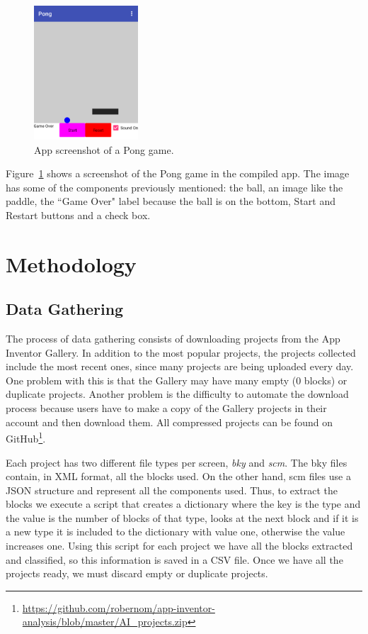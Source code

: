 \documentclass[a4paper]{article}
\begin{document}
\begin{figure}
\begin{center}
\includegraphics[height=5cm]{app-screen}
\caption{App screenshot of a Pong game.}
\label{fig:app-example}
\end{center}
\end{figure}

Figure~\ref{fig:app-example} shows a screenshot of the Pong game in the compiled app. The image has some of the components previously mentioned: the ball, an image like the paddle, the ``Game Over" label because the ball is on the bottom, Start and Restart buttons and a check box.

\section{Methodology}
\subsection{Data Gathering}
The process of data gathering consists of downloading projects from the App Inventor Gallery. In addition to the most popular projects, the projects collected include the most recent ones, since many projects are being uploaded every day. One problem with this is that the Gallery may have many empty (0 blocks) or duplicate projects. Another problem is the difficulty to automate the download process because users have to make a copy of the Gallery projects in their account and then download them. All compressed projects can be found on GitHub\footnote{\url{https://github.com/robernom/app-inventor-analysis/blob/master/AI_projects.zip}}.

Each project has two different file types per screen, \emph{bky} and \emph{scm}. The bky files contain, in XML format, all the blocks used. On the other hand, scm files use a JSON structure and represent all the components used. Thus, to extract the blocks we execute a script that creates a dictionary where the key is the type and the value is the number of blocks of that type, looks at the next block and if it is a new type it is included to the dictionary with value one, otherwise the value increases one. Using this script for each project we have all the blocks extracted and classified, so this information is saved in a CSV file. Once we have all the projects ready, we must discard empty or duplicate projects. 
\end{document}

